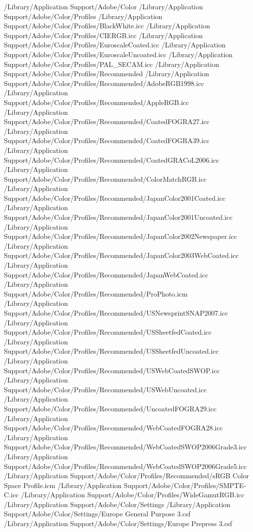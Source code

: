 /Library/Application Support/Adobe/Color
/Library/Application Support/Adobe/Color/Profiles
/Library/Application Support/Adobe/Color/Profiles/BlackWhite.icc
/Library/Application Support/Adobe/Color/Profiles/CIERGB.icc
/Library/Application Support/Adobe/Color/Profiles/EuroscaleCoated.icc
/Library/Application Support/Adobe/Color/Profiles/EuroscaleUncoated.icc
/Library/Application Support/Adobe/Color/Profiles/PAL_SECAM.icc
/Library/Application Support/Adobe/Color/Profiles/Recommended
/Library/Application Support/Adobe/Color/Profiles/Recommended/AdobeRGB1998.icc
/Library/Application Support/Adobe/Color/Profiles/Recommended/AppleRGB.icc
/Library/Application Support/Adobe/Color/Profiles/Recommended/CoatedFOGRA27.icc
/Library/Application Support/Adobe/Color/Profiles/Recommended/CoatedFOGRA39.icc
/Library/Application Support/Adobe/Color/Profiles/Recommended/CoatedGRACoL2006.icc
/Library/Application Support/Adobe/Color/Profiles/Recommended/ColorMatchRGB.icc
/Library/Application Support/Adobe/Color/Profiles/Recommended/JapanColor2001Coated.icc
/Library/Application Support/Adobe/Color/Profiles/Recommended/JapanColor2001Uncoated.icc
/Library/Application Support/Adobe/Color/Profiles/Recommended/JapanColor2002Newspaper.icc
/Library/Application Support/Adobe/Color/Profiles/Recommended/JapanColor2003WebCoated.icc
/Library/Application Support/Adobe/Color/Profiles/Recommended/JapanWebCoated.icc
/Library/Application Support/Adobe/Color/Profiles/Recommended/ProPhoto.icm
/Library/Application Support/Adobe/Color/Profiles/Recommended/USNewsprintSNAP2007.icc
/Library/Application Support/Adobe/Color/Profiles/Recommended/USSheetfedCoated.icc
/Library/Application Support/Adobe/Color/Profiles/Recommended/USSheetfedUncoated.icc
/Library/Application Support/Adobe/Color/Profiles/Recommended/USWebCoatedSWOP.icc
/Library/Application Support/Adobe/Color/Profiles/Recommended/USWebUncoated.icc
/Library/Application Support/Adobe/Color/Profiles/Recommended/UncoatedFOGRA29.icc
/Library/Application Support/Adobe/Color/Profiles/Recommended/WebCoatedFOGRA28.icc
/Library/Application Support/Adobe/Color/Profiles/Recommended/WebCoatedSWOP2006Grade3.icc
/Library/Application Support/Adobe/Color/Profiles/Recommended/WebCoatedSWOP2006Grade5.icc
/Library/Application Support/Adobe/Color/Profiles/Recommended/sRGB Color Space Profile.icm
/Library/Application Support/Adobe/Color/Profiles/SMPTE-C.icc
/Library/Application Support/Adobe/Color/Profiles/WideGamutRGB.icc
/Library/Application Support/Adobe/Color/Settings
/Library/Application Support/Adobe/Color/Settings/Europe General Purpose 3.csf
/Library/Application Support/Adobe/Color/Settings/Europe Prepress 3.csf
